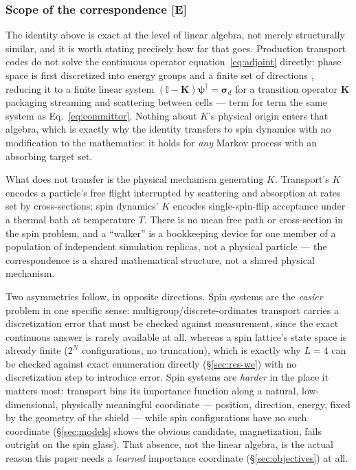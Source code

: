 \documentclass[a4paper,fleqn]{cas-sc}
\newcommand{\dg}{^{\dagger}}
\begin{document}
\subsubsection{Scope of the correspondence \textbf{[E]}}\label{sec:scope}
The identity above is exact at the level of linear algebra, not merely structurally
similar, and it is worth stating precisely how far that goes. Production transport codes
do not solve the continuous operator equation~\eqref{eq:adjoint} directly: phase space is
first discretized into energy groups and a finite set of directions
\cite{wagner1998, lewins1965}, reducing it to a finite linear system
$(\mathbb I-\mathbf K)\boldsymbol\psi\dg=\boldsymbol\sigma_d$ for a transition operator
$\mathbf K$ packaging streaming and scattering between cells --- term for term the same
system as Eq.~\eqref{eq:committor}. Nothing about $K$'s physical origin enters that algebra,
which is exactly why the identity transfers to spin dynamics with no modification to the
mathematics: it holds for \emph{any} Markov process with an absorbing target set.

What does not transfer is the physical mechanism generating $K$. Transport's $K$ encodes a
particle's free flight interrupted by scattering and absorption at rates set by
cross-sections; spin dynamics' $K$ encodes single-spin-flip acceptance under a thermal bath
at temperature $T$. There is no mean free path or cross-section in the spin problem, and a
``walker'' is a bookkeeping device for one member of a population of independent
simulation replicas, not a physical particle --- the correspondence is a shared
mathematical structure, not a shared physical mechanism.

Two asymmetries follow, in opposite directions. Spin systems are the \emph{easier} problem
in one specific sense: multigroup/discrete-ordinates transport carries a discretization
error that must be checked against measurement, since the exact continuous answer is rarely
available at all, whereas a spin lattice's state space is already finite
($2^N$ configurations, no truncation), which is exactly why $L=4$ can be checked against
exact enumeration directly (\S\ref{sec:res-we}) with no discretization step to introduce
error. Spin systems are \emph{harder} in the place it matters most: transport bins its
importance function along a natural, low-dimensional, physically meaningful coordinate ---
position, direction, energy, fixed by the geometry of the shield --- while spin
configurations have no such coordinate (\S\ref{sec:models} shows the obvious candidate,
magnetization, fails outright on the spin glass). That absence, not the linear algebra, is
the actual reason this paper needs a \emph{learned} importance coordinate
(\S\ref{sec:objectives}) at all.
\end{document}
